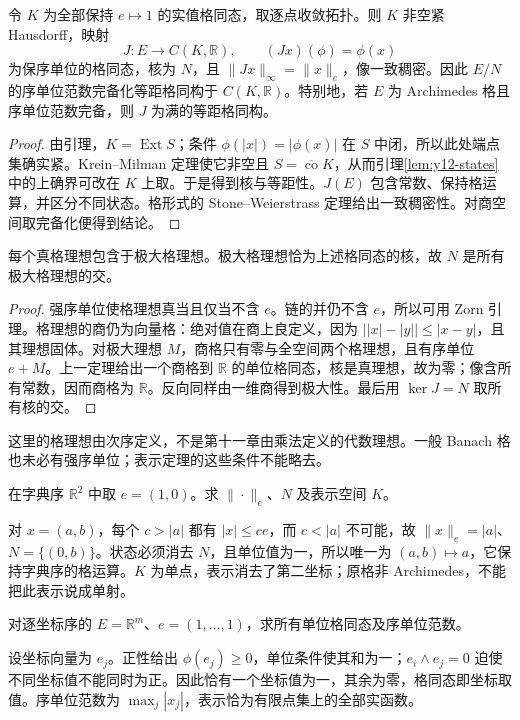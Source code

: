 \begin{theorem}[带序单位的点函数表示]\label{thm:y12-point-representation}
令 $K$ 为全部保持 $e\mapsto1$ 的实值格同态，取逐点收敛拓扑。则 $K$ 非空紧 Hausdorff，映射
\[
 J:E\longrightarrow C(K,\mathbb R),\qquad (Jx)(\phi)=\phi(x)
\]
为保序单位的格同态，核为 $N$，且 $\|Jx\|_\infty=\|x\|_e$，像一致稠密。因此 $E/N$ 的序单位范数完备化等距格同构于 $C(K,\mathbb R)$。特别地，若 $E$ 为 Archimedes 格且序单位范数完备，则 $J$ 为满的等距格同构。
\end{theorem}
\begin{proof}
由引理，$K=\operatorname{Ext}S$；条件 $\phi(|x|)=|\phi(x)|$ 在 $S$ 中闭，所以此处端点集确实紧。Krein--Milman 定理使它非空且 $S=\overline{\operatorname{co}}K$，从而引理\ref{lem:y12-states}中的上确界可改在 $K$ 上取。于是得到核与等距性。$J(E)$ 包含常数、保持格运算，并区分不同状态。格形式的 Stone--Weierstrass 定理给出一致稠密性。对商空间取完备化便得到结论。
\end{proof}

\begin{proposition}[极大格理想与无穷小]\label{prop:y12-maximal-lattice-ideals}
每个真格理想包含于极大格理想。极大格理想恰为上述格同态的核，故 $N$ 是所有极大格理想的交。
\end{proposition}
\begin{proof}
强序单位使格理想真当且仅当不含 $e$。链的并仍不含 $e$，所以可用 Zorn 引理。格理想的商仍为向量格：绝对值在商上良定义，因为 $\bigl||x|-|y|\bigr|\le|x-y|$，且其理想固体。对极大理想 $M$，商格只有零与全空间两个格理想，且有序单位 $e+M$。上一定理给出一个商格到 $\mathbb R$ 的单位格同态，核是真理想，故为零；像含所有常数，因而商格为 $\mathbb R$。反向同样由一维商得到极大性。最后用 $\ker J=N$ 取所有核的交。
\end{proof}

这里的格理想由次序定义，不是第十一章由乘法定义的代数理想。一般 Banach 格也未必有强序单位；表示定理的这些条件不能略去。

\begin{exercise}[字典序的无穷小]\label{ex:y12-infinitesimal}
在字典序 $\mathbb R^2$ 中取 $e=(1,0)$。求 $\|\cdot\|_e$、$N$ 及表示空间 $K$。
\end{exercise}
\begin{solution}
对 $x=(a,b)$，每个 $c>|a|$ 都有 $|x|\le ce$，而 $c<|a|$ 不可能，故 $\|x\|_e=|a|$、$N=\{(0,b)\}$。状态必须消去 $N$，且单位值为一，所以唯一为 $(a,b)\mapsto a$，它保持字典序的格运算。$K$ 为单点，表示消去了第二坐标；原格非 Archimedes，不能把此表示说成单射。
\end{solution}

\begin{exercise}[有限维函数表示]\label{ex:y12-finite-representation}
对逐坐标序的 $E=\mathbb R^m$、$e=(1,\ldots,1)$，求所有单位格同态及序单位范数。
\end{exercise}
\begin{solution}
设坐标向量为 $e_j$。正性给出 $\phi(e_j)\ge0$，单位条件使其和为一；$e_i\wedge e_j=0$ 迫使不同坐标值不能同时为正。因此恰有一个坐标值为一，其余为零，格同态即坐标取值。序单位范数为 $\max_j|x_j|$，表示恰为有限点集上的全部实函数。
\end{solution}

